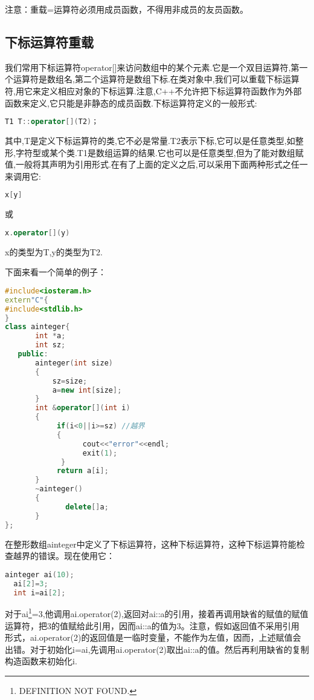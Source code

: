 \documentclass{article}
\begin{document}
注意：重载=运算符必须用成员函数，不得用非成员的友员函数。
\subsection{下标运算符重载}
\label{sec-9-5}

我们常用下标运算符operator[]来访问数组中的某个元素.它是一个双目运算符,第一个运算符是数组名,第二个运算符是数组下标.在类对象中,我们可以重载下标运算符,用它来定义相应对象的下标运算.注意,C++不允许把下标运算符函数作为外部函数来定义,它只能是非静态的成员函数.下标运算符定义的一般形式:
\begin{lstlisting}[language=c++]
       T1 T::operator[](T2)；
\end{lstlisting}
其中,T是定义下标运算符的类,它不必是常量.T2表示下标,它可以是任意类型,如整形,字符型或某个类.T1是数组运算的结果.它也可以是任意类型,但为了能对数组赋值,一般将其声明为引用形式.在有了上面的定义之后,可以采用下面两种形式之任一来调用它:
\begin{lstlisting}[language=c++]
      x[y]
\end{lstlisting}
或
\begin{lstlisting}[language=c++]
      x.operator[](y)
\end{lstlisting}

x的类型为T,y的类型为T2.

下面来看一个简单的例子：
\begin{lstlisting}[language=c++]
#include<iosteram.h>
extern"C"{
#include<stdlib.h>
}
class ainteger{
       int *a;
       int sz;
   public:
       ainteger(int size)
       {
           sz=size;
           a=new int[size];
       }
       int &operator[](int i)
       {
            if(i<0||i>=sz) //越界
            {
                  cout<<"error"<<endl;
                  exit(1);
             }
            return a[i];
       }
       ~ainteger()
       {
              delete[]a;
       }
};
\end{lstlisting}
在整形数组ainteger中定义了下标运算符，这种下标运算符，这种下标运算符能检查越界的错误。现在使用它：
\begin{lstlisting}[language=c++]
  ainteger ai(10);
  ai[2]=3;
  int i=ai[2];
\end{lstlisting}
对于ai\footnote{DEFINITION NOT FOUND.}=3,他调用ai.operator(2),返回对ai::a\footnotemark[2]{}的引用，接着再调用缺省的赋值的赋值运算符，把3的值赋给此引用，因而ai::a\footnotemark[2]{}的值为3。注意，假如返回值不采用引用 形式，ai.operator(2)的返回值是一临时变量，不能作为左值，因而，上述赋值会出错。对于初始化i=ai\footnotemark[2]{},先调用ai.operator(2)取出ai::a\footnotemark[2]{}的值。然后再利用缺省的复制构造函数来初始化i.
\end{document}
